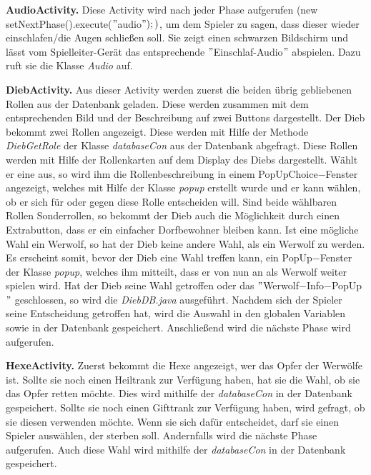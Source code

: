 \documentclass[12pt, a4paper]{article}
\begin{document}
\textbf{AudioActivity.}
Diese Activity wird nach jeder Phase aufgerufen (new setNextPhase().execute($"$audio$");)$, um dem Spieler zu sagen, dass dieser wieder einschlafen/die Augen schließen soll. Sie zeigt einen schwarzen Bildschirm und lässt vom Spielleiter-Gerät das entsprechende $"$Einschlaf-Audio$"$ abspielen. Dazu ruft sie die Klasse \textit{Audio} auf.

\vspace{0,3 cm}

\textbf{DiebActivity.}
Aus dieser Activity werden zuerst die beiden übrig gebliebenen Rollen aus der Datenbank geladen. Diese werden zusammen mit dem entsprechenden Bild und der Beschreibung auf zwei Buttons dargestellt.
Der Dieb bekommt zwei Rollen angezeigt. Diese werden mit Hilfe der Methode \textit{DiebGetRole} der Klasse \textit{databaseCon} aus der Datenbank abgefragt. Diese Rollen werden mit Hilfe der Rollenkarten auf dem Display des Diebs dargestellt. Wählt er eine aus, so wird ihm die Rollenbeschreibung in einem PopUpChoice$-$Fenster angezeigt, welches mit Hilfe der Klasse \textit{popup} erstellt wurde und er kann wählen, ob er sich für oder gegen diese Rolle entscheiden will. 
Sind beide wählbaren Rollen Sonderrollen, so bekommt der Dieb auch die Möglichkeit durch einen Extrabutton, dass er ein einfacher Dorfbewohner bleiben kann. Ist eine mögliche Wahl ein Werwolf, so hat der Dieb keine andere Wahl, als ein Werwolf zu werden. Es erscheint somit, bevor der Dieb eine Wahl treffen kann, ein PopUp$-$Fenster der Klasse \textit{popup}, welches ihm mitteilt, dass er von nun an als Werwolf weiter spielen wird. Hat der Dieb seine Wahl getroffen oder das $"$Werwolf$-$Info$-$PopUp$"$ geschlossen, so wird die \textit{DiebDB.java} ausgeführt. 
Nachdem sich der Spieler seine Entscheidung getroffen hat, wird die Auswahl in den globalen Variablen sowie in der Datenbank gespeichert. Anschließend wird die nächste Phase wird aufgerufen.

\vspace{0,3 cm}
      
\textbf{HexeActivity.}
Zuerst bekommt die Hexe angezeigt, wer das Opfer der Werwölfe ist.
Sollte sie noch einen Heiltrank zur Verfügung haben, hat sie die Wahl, ob sie das Opfer retten möchte. 
Dies wird mithilfe der \textit{databaseCon} in der Datenbank gespeichert.
Sollte sie noch einen Gifttrank zur Verfügung haben, wird gefragt, ob sie diesen verwenden möchte.
Wenn sie sich dafür entscheidet, darf sie einen Spieler auswählen, der sterben soll.
Andernfalls wird die nächste Phase aufgerufen.
Auch diese Wahl wird mithilfe der \textit{databaseCon} in der Datenbank gespeichert.
      
\end{document}
